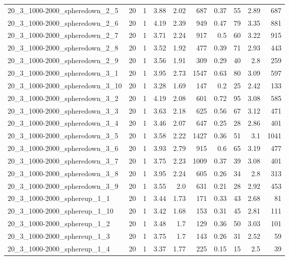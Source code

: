 \begin{center}
\begin{scriptsize}
\begin{longtable}{lrrrrrrrrr}
20\_3\_1000-2000\_spheredown\_2\_5 & 20 & 1 & 3.88 & 2.02 & 687 & 0.37 & 55 & 2.89 & 687\\
20\_3\_1000-2000\_spheredown\_2\_6 & 20 & 1 & 4.19 & 2.39 & 949 & 0.47 & 79 & 3.35 & 881\\
20\_3\_1000-2000\_spheredown\_2\_7 & 20 & 1 & 3.71 & 2.24 & 917 & 0.5 & 60 & 3.22 & 915\\
20\_3\_1000-2000\_spheredown\_2\_8 & 20 & 1 & 3.52 & 1.92 & 477 & 0.39 & 71 & 2.93 & 443\\
20\_3\_1000-2000\_spheredown\_2\_9 & 20 & 1 & 3.56 & 1.91 & 309 & 0.29 & 40 & 2.8 & 259\\
20\_3\_1000-2000\_spheredown\_3\_1 & 20 & 1 & 3.95 & 2.73 & 1547 & 0.63 & 80 & 3.09 & 597\\
20\_3\_1000-2000\_spheredown\_3\_10 & 20 & 1 & 3.28 & 1.69 & 147 & 0.2 & 25 & 2.42 & 133\\
20\_3\_1000-2000\_spheredown\_3\_2 & 20 & 1 & 4.19 & 2.08 & 601 & 0.72 & 95 & 3.08 & 585\\
20\_3\_1000-2000\_spheredown\_3\_3 & 20 & 1 & 3.63 & 2.18 & 625 & 0.56 & 67 & 3.12 & 471\\
20\_3\_1000-2000\_spheredown\_3\_4 & 20 & 1 & 3.46 & 2.07 & 647 & 0.25 & 28 & 2.86 & 401\\
20\_3\_1000-2000\_spheredown\_3\_5 & 20 & 1 & 3.58 & 2.22 & 1427 & 0.36 & 51 & 3.1 & 1041\\
20\_3\_1000-2000\_spheredown\_3\_6 & 20 & 1 & 3.93 & 2.79 & 915 & 0.6 & 65 & 3.19 & 477\\
20\_3\_1000-2000\_spheredown\_3\_7 & 20 & 1 & 3.75 & 2.23 & 1009 & 0.37 & 39 & 3.08 & 401\\
20\_3\_1000-2000\_spheredown\_3\_8 & 20 & 1 & 3.95 & 2.24 & 605 & 0.26 & 34 & 2.8 & 313\\
20\_3\_1000-2000\_spheredown\_3\_9 & 20 & 1 & 3.55 & 2.0 & 631 & 0.21 & 28 & 2.92 & 453\\
20\_3\_1000-2000\_sphereup\_1\_1 & 20 & 1 & 3.44 & 1.73 & 171 & 0.33 & 43 & 2.68 & 81\\
20\_3\_1000-2000\_sphereup\_1\_10 & 20 & 1 & 3.42 & 1.68 & 153 & 0.31 & 45 & 2.81 & 111\\
20\_3\_1000-2000\_sphereup\_1\_2 & 20 & 1 & 3.48 & 1.7 & 129 & 0.36 & 50 & 3.03 & 101\\
20\_3\_1000-2000\_sphereup\_1\_3 & 20 & 1 & 3.75 & 1.7 & 143 & 0.26 & 31 & 2.52 & 59\\
20\_3\_1000-2000\_sphereup\_1\_4 & 20 & 1 & 3.37 & 1.77 & 225 & 0.15 & 15 & 2.5 & 39\\

\end{longtable}
\end{scriptsize}
\end{center}

